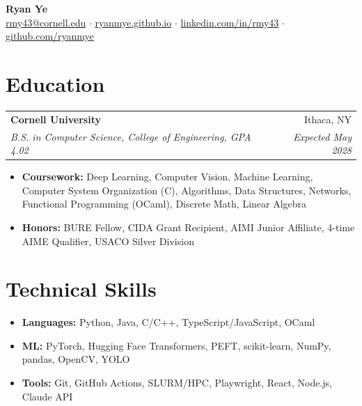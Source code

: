 \documentclass[10pt,letterpaper]{article}
\makeatletter
\newcommand{\entry}[4]{%
  \noindent\begin{tabular*}{\textwidth}{@{}l@{\extracolsep{\fill}}r@{}}
    \textbf{#1} & #2 \\
    \textit{#3} & \textit{#4} \\
  \end{tabular*}\vspace{-1pt}}
\makeatother
\begin{document}
\begin{center}
  {\LARGE\bfseries Ryan Ye}\\[2pt]
  \href{mailto:rmy43@cornell.edu}{rmy43@cornell.edu} $\cdot$
  \href{https://ryanmye.github.io}{ryanmye.github.io} $\cdot$
  \href{https://www.linkedin.com/in/rmy43}{linkedin.com/in/rmy43} $\cdot$
  \href{https://github.com/ryanmye}{github.com/ryanmye}
\end{center}

\section{Education}
\entry{Cornell University}{Ithaca, NY}{B.S. in Computer Science, College of Engineering, GPA 4.02}{Expected May 2028}
\begin{itemize}
  \item \textbf{Coursework:} Deep Learning, Computer Vision, Machine Learning, Computer System Organization (C), Algorithms, Data Structures, Networks, Functional Programming (OCaml), Discrete Math, Linear Algebra
  \item \textbf{Honors:} BURE Fellow, CIDA Grant Recipient, AIMI Junior Af{}f{}iliate, 4-time AIME Qualifier, USACO Silver Division
\end{itemize}

\section{Technical Skills}
\begin{itemize}
  \item \textbf{Languages:} Python, Java, C/C++, TypeScript/JavaScript, OCaml
  \item \textbf{ML:} PyTorch, Hugging Face Transformers, PEFT, scikit-learn, NumPy, pandas, OpenCV, YOLO
  \item \textbf{Tools:} Git, GitHub Actions, SLURM/HPC, Playwright, React, Node.js, Claude API
\end{itemize}
\end{document}
